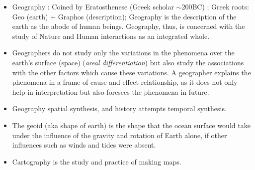 \documentclass[8pt, a4paper, oneside, twocolumn]{extarticle}
\begin{document}
\begin{itemize}
  \item Geography : Coined by Eratosthenese (Greek scholar $\sim$200BC) ; Greek roots: Geo (earth) + Graphos (description); Geography is the description of the earth as the abode of human beings. Geography, thus, is concerned with the study of Nature and Human interactions as an integrated whole. 
  \item Geographers do not study only the variations in the phenomena over the earth’s surface (space) (\textit{areal differentiation}) but also study the associations with the other factors which cause these variations. A geographer explains the phenomena in a frame of cause and effect relationship, as it does not only help in interpretation but also foresees the phenomena in future.
  \item Geography spatial synthesis, and history attempts temporal synthesis. 
  \item The geoid (aka shape of earth) is the shape that the ocean surface would take under the influence of the gravity and rotation of Earth alone, if other influences such as winds and tides were absent.
  \item Cartography is the study and practice of making maps.
\end{itemize}
\end{document}
